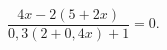 \begin{ex}[type=equation]
	\begin{condition}
		 $\dfrac{4x - 2(5+2x)}{0,3(2+0,4 x)+1} = 0.$
	\end{condition}
\end{ex}